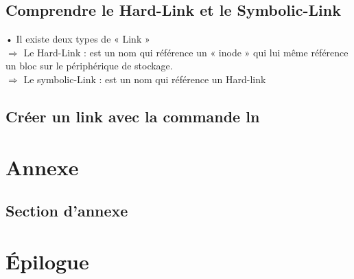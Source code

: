\documentclass[a4paper, 12pt, french]{book}
\begin{document}
\section{\Large Comprendre le Hard-Link et le Symbolic-Link} 

• Il existe deux types de « Link »\\

$\Rightarrow$ Le Hard-Link : est un nom qui référence un « inode » qui lui même référence un bloc sur le périphérique de stockage.\\

$\Rightarrow$ Le symbolic-Link : est un nom qui référence un Hard-link

\section{\Large Créer un link avec la commande ln} 


 
 
   \appendix
   \chapter{Annexe}
      \section{Section d'annexe}
    
   \backmatter
   \chapter{Épilogue}
\end{document}

